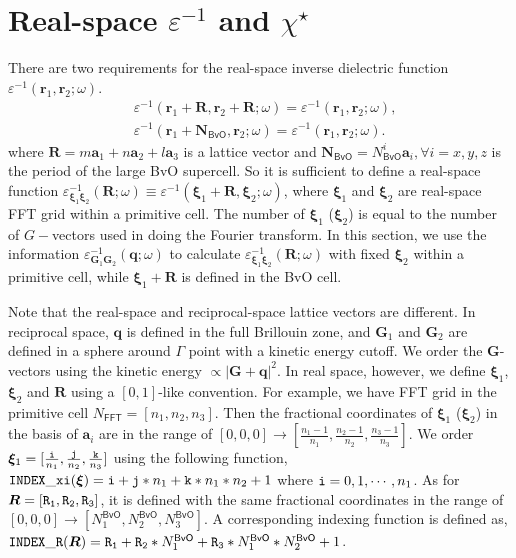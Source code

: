 \documentclass[11pt, oneside]{article}          %
\begin{document}
\section{Real-space $\varepsilon^{-1}$ and $\chi^{\star}$}
\label{sec:real-space-epsilon}

There are two requirements for the real-space inverse dielectric function $\varepsilon^{-1}({\bm r}_1, {\bm r}_2; \omega)$.
\begin{equation}
  \label{eq:two_conditions}
  \begin{aligned}
    & \varepsilon^{-1}({\bm r}_1+{\bm R},{\bm r}_2+{\bm R};\omega) = \varepsilon^{-1}({\bm r}_1,{\bm r}_2;\omega), \\
    & \varepsilon^{-1}({\bm r}_1+{\bm N}_{\mathsf{BvO}},{\bm r}_2;\omega) = \varepsilon^{-1}({\bm r}_1,{\bm r}_2;\omega).
  \end{aligned}
\end{equation}
where ${\bm R}=m {\bm a}_1 + n {\bm a}_2 + l {\bm a}_3$ is a lattice vector and ${\bm N}_{\mathsf{BvO}} = N^{i}_{\mathsf{BvO}} {\bm a}_i, \forall i=x,y,z$ is the period of the large BvO supercell. So it is sufficient to define a real-space function $\varepsilon^{-1}_{{\bm \xi}_1 {\bm \xi}_2}({\bm R}; \omega) \equiv \varepsilon^{-1}({\bm \xi}_1 + {\bm R}, {\bm \xi}_2; \omega)$, where ${\bm \xi}_1$ and ${\bm \xi}_2$ are real-space FFT grid within a primitive cell. The number of ${\bm \xi}_1$ (${\bm \xi}_2$) is equal to the number of $G-$vectors used in doing the Fourier transform. In this section, we use the information $\varepsilon^{-1}_{{\bm G}_1 {\bm G}_2}({\bm q}; \omega)$ to calculate $\varepsilon^{-1}_{{\bm \xi}_1 {\bm \xi}_2} ({\bm R}; \omega)$ with fixed ${\bm \xi}_2$ within a primitive cell, while ${\bm \xi}_1+{\bm R}$ is defined in the BvO cell.

Note that the real-space and reciprocal-space lattice vectors are different. In reciprocal space, ${\bm q}$ is defined in the full Brillouin zone, and ${\bm G}_1$ and ${\bm G}_2$ are defined in a sphere around $\Gamma$ point with a kinetic energy cutoff. We order the ${\bm G}$-vectors using the kinetic energy $\propto |{\bm G}+{\bm q}|^2$. In real space, however, we define ${\bm \xi}_1$, ${\bm \xi}_2$ and ${\bm R}$ using a $[0,1]$-like convention. For example, we have FFT grid in the primitive cell $N_{\mathsf{FFT}} = [n_1,n_2,n_3]$. Then the fractional coordinates of ${\bm \xi}_1$ (${\bm \xi}_2$) in the basis of ${\bm a}_i$ are in the range of $[0,0,0] \rightarrow [\frac{n_1-1}{n_1},\frac{n_2-1}{n_2},\frac{n_3-1}{n_3}]$. We order ${\bm \xi}_1=[\frac{\tt i}{n_1},\frac{\tt j}{n_2},\frac{\tt k}{n_3}]$ using the following function, ${\tt INDEX\_xi}({\bm \xi}) = {\tt i} + {\tt j} * n_1 + {\tt k} * n_1 * n_2+1$ where ${\tt i} = 0, 1, \cdots, n_1$. As for ${\bm R}=[{\tt R_1}, {\tt R_2}, {\tt R_3}]$, it is defined with the same fractional coordinates in the range of $[0,0,0] \rightarrow [N^{\mathsf{BvO}}_1,N^{\mathsf{BvO}}_2,N^{\mathsf{BvO}}_3]$. A corresponding indexing function is defined as, ${\tt INDEX\_R}({\bm R}) = {\tt R_1} + {\tt R_2} * N^{\mathsf{BvO}}_1 + {\tt R_3} * N^{\mathsf{BvO}}_1 * N^{\mathsf{BvO}}_2 + 1$.
\end{document}
